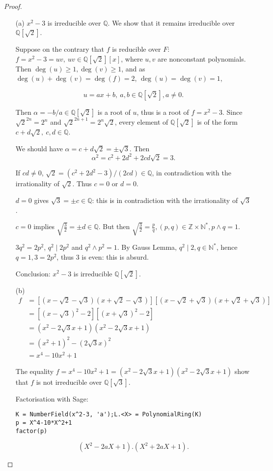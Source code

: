 \documentclass[11pt,a4paper]{article}
\begin{document}
\begin{proof}
\begin{enumerate}
\item[(a)]$x^2-3$ is irreducible over $\mathbb{Q}$. We show that it remains irreducible over $\mathbb{Q}[\sqrt{2}]$.

Suppose on the contrary that $f$ is reducible over $F$:  $f = x^2 - 3 = u v,\ u v \in \mathbb{Q}[\sqrt{2}][x]$, where $u,v$ are nonconstant polynomials. Then $\deg(u)\geq 1, \deg(v) \geq 1$, and as $\deg(u) + \deg(v) = \deg(f) = 2$, $\deg(u) = \deg(v)=1$, 

$$u = ax+b,\ a,b\in \mathbb{Q}[\sqrt{2}], a\neq 0.$$

Then $\alpha = -b/a \in \mathbb{Q}[\sqrt{2}]$ is a root of $u$, thus is a root of $f = x^2-3$. Since $\sqrt{2}^{2n} = 2^n$ and $\sqrt{2}^{2n+1} = 2^n \sqrt{2}$, every element of $\mathbb{Q}[\sqrt{2}]$  is of the form $c+ d\sqrt{2} , \ c,d \in \mathbb{Q}$.

We should have $\alpha = c + d \sqrt{2} = \pm \sqrt{3}. $
Then $$\alpha^2 = c^2+2d^2  +2cd\sqrt{2}=3.$$

If $cd\neq 0$, $\sqrt{2} = (c^2+2d^2 -3)/(2cd) \in \mathbb{Q}$, in contradiction with the irrationality of $\sqrt{2}$. Thus $c=0$ or $d=0$.

$d=0$ gives $\sqrt{3} = \pm c \in \mathbb{Q}$: this is in contradiction with the irrationality of $\sqrt{3}$.

$c=0$ implies $\sqrt{\frac{3}{2}} = \pm d \in \mathbb{Q}$. But then $\sqrt{\frac{3}{2}} =\frac{p}{q}, (p,q) \in \mathbb{Z} \times \mathbb{N}^*, p\wedge q=1$.

$3q^2 = 2 p^2$, $q^2 \mid 2 p^2$ and $q^2 \wedge p^2 = 1$. By Gauss Lemma, $q^2 \mid 2, q\in \mathbb{N}^*$, hence $q=1, 3 = 2p^2$, thus $3$ is even: this is absurd.

Conclusion: $x^2-3$ is irreducible $\mathbb{Q}[\sqrt{2}]$.


\item[(b)]
\begin{align*}
 f&= [(x-\sqrt{2} - \sqrt{3})(x+\sqrt{2} -\sqrt{3})] [(x-\sqrt{2} + \sqrt{3})(x+\sqrt{2} + \sqrt{3})]\\
&=[(x-\sqrt{3})^2-2][(x+\sqrt{3})^2-2]\\
&= (x^2 -2\sqrt{3} x +1)(x^2 -2\sqrt{3} x +1)\\
&= (x^2+1)^2 - (2\sqrt{3}x)^2\\
&=x^4 -10x^2 +1
\end{align*}

The equality $f = x^4 -10x^2 +1 = (x^2 -2\sqrt{3} x +1)(x^2 -2\sqrt{3} x +1)$ show that $f$ is not irreducible over $\mathbb{Q}[\sqrt{3}]$.

{\bigskip}

Factorisation with Sage:
\begin{verbatim}
K = NumberField(x^2-3, 'a');L.<X> = PolynomialRing(K)
p = X^4-10*X^2+1
factor(p)
\end{verbatim}
$$(X^2-2aX+1).(X^2+2aX+1).$$
\end{enumerate}
\end{proof}
\end{document}
